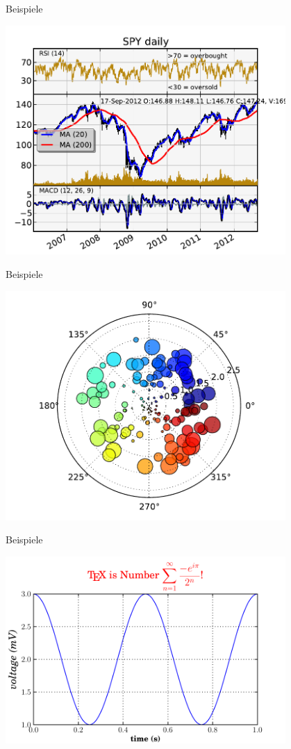\begin{frame}{Beispiele}
  \begin{center}
    \includegraphics[width=0.8\textwidth]{img/matplotlib/finance.pdf}
  \end{center}
\end{frame}

\begin{frame}{Beispiele}
  \begin{center}
    \includegraphics[width=0.8\textwidth]{img/matplotlib/polar.pdf}
  \end{center}
\end{frame}

\begin{frame}{Beispiele}
  \begin{center}
    \includegraphics[width=0.8\textwidth]{img/matplotlib/tex.pdf}
  \end{center}
\end{frame}

